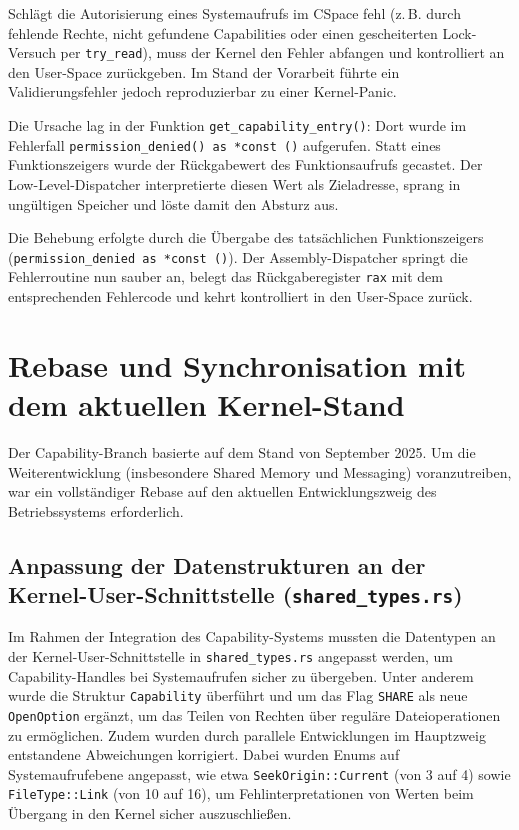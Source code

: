 Schlägt die Autorisierung eines Systemaufrufs im CSpace fehl (z.\,B. durch fehlende Rechte, nicht gefundene Capabilities oder einen gescheiterten Lock-Versuch per \texttt{try\_read}), muss der Kernel den Fehler abfangen und kontrolliert an den User-Space zurückgeben. Im Stand der Vorarbeit führte ein Validierungsfehler jedoch reproduzierbar zu einer Kernel-Panic.

Die Ursache lag in der Funktion \texttt{get\_capability\_entry()}: Dort wurde im Fehlerfall \texttt{permission\_denied() as *const ()} aufgerufen. Statt eines Funktionszeigers wurde der Rückgabewert des Funktionsaufrufs gecastet. Der Low-Level-Dispatcher interpretierte diesen Wert als Zieladresse, sprang in ungültigen Speicher und löste damit den Absturz aus.

Die Behebung erfolgte durch die Übergabe des tatsächlichen Funktionszeigers (\texttt{permission\_denied as *const ()}). Der Assembly-Dispatcher springt die Fehlerroutine nun sauber an, belegt das Rückgaberegister \texttt{rax} mit dem entsprechenden Fehlercode und kehrt kontrolliert in den User-Space zurück.


\section{Rebase und Synchronisation mit dem aktuellen Kernel-Stand}

Der Capability-Branch basierte auf dem Stand von September 2025. Um die Weiterentwicklung (insbesondere Shared Memory und Messaging) voranzutreiben, war ein vollständiger Rebase auf den aktuellen Entwicklungszweig des Betriebssystems erforderlich.


\subsection{Anpassung der Datenstrukturen an der Kernel-User-Schnittstelle (\texttt{shared\_types.rs})}

Im Rahmen der Integration des Capability-Systems mussten die Datentypen an der Kernel-User-Schnittstelle in \texttt{shared\_types.rs} angepasst werden, um Capability-Handles bei Systemaufrufen sicher zu übergeben. Unter anderem wurde die Struktur \texttt{Capability} überführt und um das Flag \texttt{SHARE} als neue \texttt{OpenOption} ergänzt, um das Teilen von Rechten über reguläre Dateioperationen zu ermöglichen. Zudem wurden durch parallele Entwicklungen im Hauptzweig entstandene Abweichungen korrigiert. Dabei wurden Enums auf Systemaufrufebene angepasst, wie etwa \texttt{SeekOrigin::Current} (von 3 auf 4) sowie \texttt{FileType::Link} (von 10 auf 16), um Fehlinterpretationen von Werten beim Übergang in den Kernel sicher auszuschließen.


